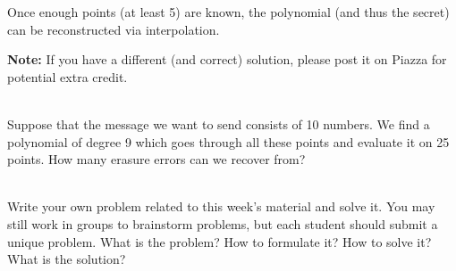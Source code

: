 \documentclass[]{article}
\newif\ifsolutions
\renewcommand{\answer}[1]{{\color{mydarkblue}\textbf{Solution:}#1}}
\begin{document}
\begin{qunlist}
{{Once enough points (at least 5) are known, the polynomial (and thus the secret) can be reconstructed via interpolation.

\textbf{Note:} If you have a different (and correct) solution, please post it on Piazza for potential extra credit.

}}\fi



 \\ %
Suppose that the message we want to send consists of 10 numbers. We find a polynomial of degree 9 which goes through all these points and evaluate it on 25 points. How many erasure errors can we recover from?

\ifsolutions{ \answer {
For $ k $ erasure errors, we need to send $ k $ additional packets for a total of $ n+k $. Here, $ n=10 $ and $ n+k=25 $, so we can recover from 15 erasure errors.

For $ k $ general errors, we need $ 2k $ additional packets. We have 15 additional packets, so we may recover from $ \lfloor 15/2 \rfloor = 7 $ general errors.
}}\fi



 \\
Write your own problem related to this week's material and solve it. You may still work in groups to brainstorm problems, but each student should submit a unique problem. What is the problem? How to formulate it? How to solve it? What is the solution?
  
  
    
\end{qunlist}
\end{document}
